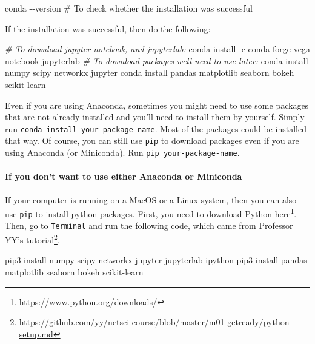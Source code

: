 \documentclass[
]{krantz}
\makeatletter
\newenvironment{Shaded}{\begin{snugshade}}{\end{snugshade}}
\newcommand{\CommentTok}[1]{\textcolor[rgb]{0.37,0.37,0.37}{\textit{#1}}}
\newcommand{\ExtensionTok}[1]{#1}
\newcommand{\NormalTok}[1]{#1}
\renewcommand{\href}[2]{#2\footnote{\url{#1}}}
\newenvironment{kframe}{%
\medskip{}
\setlength{\fboxsep}{.8em}
 \def\at@end@of@kframe{}%
 \ifinner\ifhmode%
  \def\at@end@of@kframe{\end{minipage}}%
  \begin{minipage}{\columnwidth}%
 \fi\fi%
 \def\FrameCommand##1{\hskip\@totalleftmargin \hskip-\fboxsep
 \colorbox{shadecolor}{##1}\hskip-\fboxsep
     \hskip-\linewidth \hskip-\@totalleftmargin \hskip\columnwidth}%
 \MakeFramed {\advance\hsize-\width
   \@totalleftmargin\z@ \linewidth\hsize
   \@setminipage}}%
 {\par\unskip\endMakeFramed%
 \at@end@of@kframe}
\renewenvironment{Shaded}{\begin{kframe}}{\end{kframe}}
\makeatother
\begin{document}
\begin{Shaded}
\begin{Highlighting}[]
\ExtensionTok{conda}\NormalTok{ {-}{-}version \# To check whether the installation was successful}
\end{Highlighting}
\end{Shaded}

If the installation was successful, then do the following:

\begin{Shaded}
\begin{Highlighting}[]
\CommentTok{\# To download jupyter notebook, and jupyterlab:}
\ExtensionTok{conda}\NormalTok{ install {-}c conda{-}forge vega notebook jupyterlab }
\CommentTok{\# To download packages we\textquotesingle{}ll need to use later:}
\ExtensionTok{conda}\NormalTok{ install numpy scipy networkx jupyter }
\ExtensionTok{conda}\NormalTok{ install pandas matplotlib seaborn bokeh scikit{-}learn }
\end{Highlighting}
\end{Shaded}

Even if you are using Anaconda, sometimes you might need to use some packages that are not already installed and you'll need to install them by yourself. Simply run \texttt{conda\ install\ your-package-name}. Most of the packages could be installed that way. Of course, you can still use \texttt{pip} to download packages even if you are using Anaconda (or Miniconda). Run \texttt{pip\ your-package-name}.

\hypertarget{if-you-dont-want-to-use-either-anaconda-or-miniconda}{%
\paragraph{If you don't want to use either Anaconda or Miniconda}\label{if-you-dont-want-to-use-either-anaconda-or-miniconda}}

If your computer is running on a MacOS or a Linux system, then you can also use \texttt{pip} to install python packages. First, you need to download Python \href{https://www.python.org/downloads/}{here}. Then, go to \texttt{Terminal} and run the following code, which came from \href{https://github.com/yy/netsci-course/blob/master/m01-getready/python-setup.md}{Professor YY's tutorial}.

\begin{Shaded}
\begin{Highlighting}[]
\ExtensionTok{pip3}\NormalTok{ install numpy scipy networkx jupyter jupyterlab ipython }
\ExtensionTok{pip3}\NormalTok{ install pandas matplotlib seaborn bokeh scikit{-}learn}
\end{Highlighting}
\end{Shaded}
\end{document}
